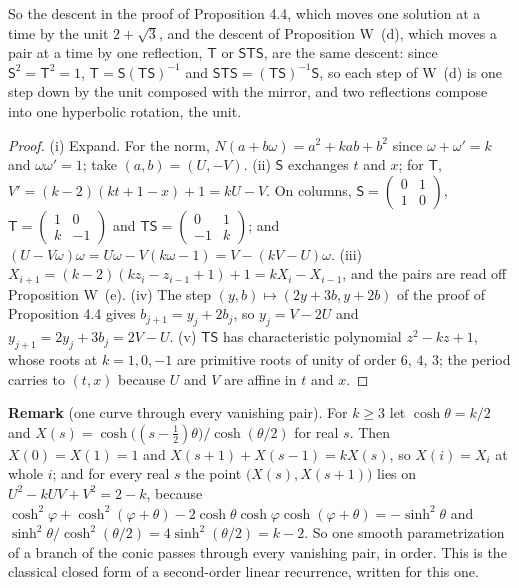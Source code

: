 \documentclass[11pt]{article}
\begin{document}
So the descent in the proof of Proposition 4.4, which moves one solution at a time by the unit $2+\sqrt3$, and the descent of Proposition W~(d), which moves a pair at a time by one reflection, $\mathsf{T}$ or $\mathsf{S}\mathsf{T}\mathsf{S}$, are the same descent: since $\mathsf{S}^2=\mathsf{T}^2=1$, $\mathsf{T}=\mathsf{S}(\mathsf{T}\mathsf{S})^{-1}$ and $\mathsf{S}\mathsf{T}\mathsf{S}=(\mathsf{T}\mathsf{S})^{-1}\mathsf{S}$, so each step of W~(d) is one step down by the unit composed with the mirror, and two reflections compose into one hyperbolic rotation, the unit.

\begin{proof}
(i) Expand. For the norm, $N(a+b\omega)=a^2+kab+b^2$ since $\omega+\omega'=k$ and $\omega\omega'=1$; take $(a,b)=(U,-V)$. (ii) $\mathsf{S}$ exchanges $t$ and $x$; for $\mathsf{T}$, $V'=(k-2)(kt+1-x)+1=kU-V$. On columns, $\mathsf{S}=\begin{pmatrix}0&1\\1&0\end{pmatrix}$, $\mathsf{T}=\begin{pmatrix}1&0\\k&-1\end{pmatrix}$ and $\mathsf{T}\mathsf{S}=\begin{pmatrix}0&1\\-1&k\end{pmatrix}$; and $(U-V\omega)\omega=U\omega-V(k\omega-1)=V-(kV-U)\omega$. (iii) $X_{i+1}=(k-2)(kz_i-z_{i-1}+1)+1=kX_i-X_{i-1}$, and the pairs are read off Proposition W~(e). (iv) The step $(y,b)\mapsto(2y+3b,y+2b)$ of the proof of Proposition 4.4 gives $b_{j+1}=y_j+2b_j$, so $y_j=V-2U$ and $y_{j+1}=2y_j+3b_j=2V-U$. (v) $\mathsf{T}\mathsf{S}$ has characteristic polynomial $z^2-kz+1$, whose roots at $k=1,0,-1$ are primitive roots of unity of order $6$, $4$, $3$; the period carries to $(t,x)$ because $U$ and $V$ are affine in $t$ and $x$.
\end{proof}

\medskip
\noindent\textbf{Remark} (one curve through every vanishing pair). For $k\ge3$ let $\cosh\theta=k/2$ and $X(s)=\cosh\bigl((s-\frac12)\theta\bigr)/\cosh(\theta/2)$ for real $s$. Then $X(0)=X(1)=1$ and $X(s+1)+X(s-1)=kX(s)$, so $X(i)=X_i$ at whole $i$; and for every real $s$ the point $\bigl(X(s),X(s+1)\bigr)$ lies on $U^2-kUV+V^2=2-k$, because $\cosh^2\varphi+\cosh^2(\varphi+\theta)-2\cosh\theta\cosh\varphi\cosh(\varphi+\theta)=-\sinh^2\theta$ and $\sinh^2\theta/\cosh^2(\theta/2)=4\sinh^2(\theta/2)=k-2$. So one smooth parametrization of a branch of the conic passes through every vanishing pair, in order. This is the classical closed form of a second-order linear recurrence, written for this one.
\end{document}
